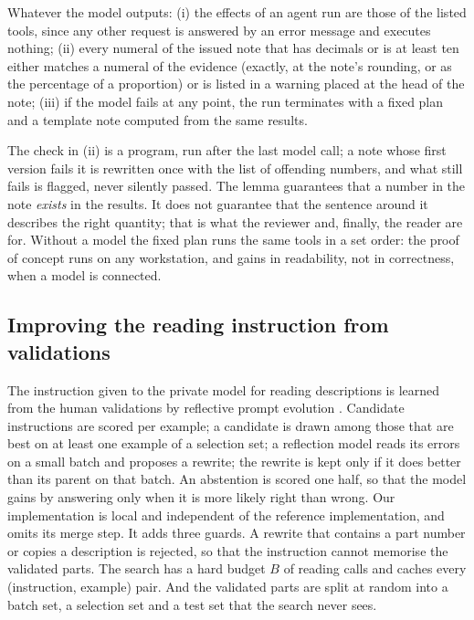 \begin{lemma}\label{lem:grounding}
Whatever the model outputs: (i) the effects of an agent run are those of the listed tools, since any other request
is answered by an error message and executes nothing; (ii) every numeral of the issued note that has decimals or is
at least ten either matches a numeral of the evidence (exactly, at the note's rounding, or as the percentage of a
proportion) or is listed in a warning placed at the head of the note; (iii) if the model fails at any point, the
run terminates with a fixed plan and a template note computed from the same results.
\end{lemma}

The check in (ii) is a program, run after the last model call; a note whose first version fails it is rewritten
once with the list of offending numbers, and what still fails is flagged, never silently passed. The lemma
guarantees that a number in the note \emph{exists} in the results. It does not guarantee that the sentence around
it describes the right quantity; that is what the reviewer and, finally, the reader are for. Without a model the
fixed plan runs the same tools in a set order: the proof of concept runs on any workstation, and gains in
readability, not in correctness, when a model is connected.

\subsection{Improving the reading instruction from validations}

The instruction given to the private model for reading descriptions is learned from the human validations by
reflective prompt evolution \citep{agrawal2025gepa}. Candidate instructions are scored per example; a candidate is
drawn among those that are best on at least one example of a selection set; a reflection model reads its errors on
a small batch and proposes a rewrite; the rewrite is kept only if it does better than its parent on that batch.
An abstention is scored one half, so that the model gains by answering only when it is more likely right than
wrong. Our implementation is local and independent of the reference implementation, and omits its merge step. It
adds three guards. A rewrite that contains a part number or copies a description is rejected, so that the
instruction cannot memorise the validated parts. The search has a hard budget $B$ of reading calls and caches every
(instruction, example) pair. And the validated parts are split at random into a batch set, a selection set and a
test set that the search never sees.


